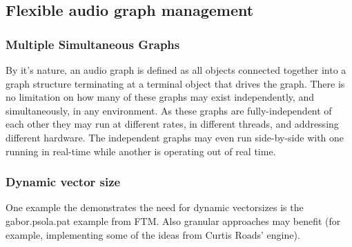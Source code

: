 \documentclass[twoside,a4paper]{article}
\begin{document}

%   



\subsection{Flexible audio graph management} %

\subsubsection{Multiple Simultaneous Graphs} %

By it's nature, an audio graph is defined as all objects connected together into a graph structure terminating at a terminal object that drives the graph.  
There is no limitation on how many of these graphs may exist independently, and simultaneously, in any environment.  
As these graphs are fully-independent of each other they may run at different rates, in different threads, and addressing different hardware.  The independent graphs may even run side-by-side with one running in real-time while another is operating out of real time.



\subsubsection{Dynamic vector size} %


One example the demonstrates the need for dynamic vectorsizes is the gabor.psola.pat example from FTM. 
Also granular approaches may benefit (for example, implementing some of the ideas from Curtis Roads' engine).
\end{document}
